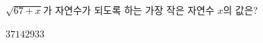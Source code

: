 $\sqrt{67+x}$가 자연수가 되도록 하는 가장 작은 자연수 $x$의 값은?
\begin{choices32}{$3$}{$7$}{$14$}{$29$}{$33$}\end{choices32}
